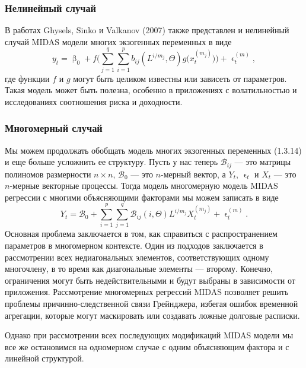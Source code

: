 \documentclass[a4paper, 12pt]{extarticle}
\numberwithin{equation}{subsection}
\renewcommand{\beta}{\upbeta}
\renewcommand{\epsilon}{\upvarepsilon}
\begin{document}
	\subsubsection{Нелинейный случай}
	В работах Ghysels, Sinko и Valkanov (2007) также представлен и нелинейный случай MIDAS модели многих экзогенных переменных в виде
	\begin{equation}
		y_t = \beta_0 + f\Big(\sum_{j=1}^{q} \sum_{i=1}^{p} b_{ij}(L^{i/m_j},\Theta) g\big(x_t^{(m_j)}\big)\Big) + \epsilon_t^{(m)},
	\end{equation}
	где функции $f$ и $g$ могут быть целиком известны или зависеть от параметров. Такая модель может быть полезна, особенно в приложениях с волатильностью
	и исследованиях соотношения риска и доходности. 
	\subsubsection{Многомерный случай}
	Мы можем продолжать обобщать модель многих экзогенных переменных (1.3.14) и еще больше усложнить ее структуру. Пусть у нас теперь $\mathcal{B}_{ij}$ --- это матрицы полиномов размерности $n\times n$, $\mathcal{B}_0$ --- это $n$-мерный вектор, а $Y_t$, $\epsilon_t$ и $X_t$ --- это $n$-мерные векторные процессы. Тогда модель многомерную модель MIDAS регрессии с многими объясняющими факторами мы можем записать в виде 
	\begin{equation}
		Y_t = \mathcal{B}_0 + \sum_{i=1}^{p} \sum_{j=1}^{q} \mathcal{B}_{ij}(i,\Theta) L^{i/m_j} X_t^{(m_j)} + \epsilon_t^{(m)}.
	\end{equation}
	Основная проблема заключается в том, как справиться
	с распространением параметров в многомерном контексте. Один из подходов заключается в рассмотрении всех недиагональных
	элементов, соответствующих одному многочлену, в то время как диагональные элементы --- второму.
	Конечно, ограничения могут быть недействительными и будут выбраны в зависимости от приложения.
	Рассмотрение многомерных регрессий MIDAS позволяет решить проблемы причинно-следственной связи Грейнджера, избегая ошибок временной агрегации, которые могут маскировать или создавать ложные долговые расписки.
	
	
	Однако при рассмотрении всех последующих модификаций MIDAS модели мы все же остановимся на одномерном случае с одним объясняющим фактора и с линейной структурой.
	
\end{document}
